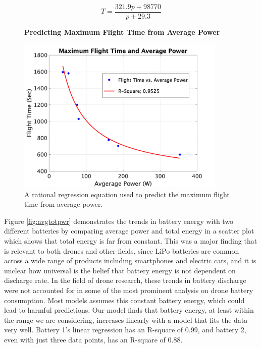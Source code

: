 \documentclass{article}
\begin{document}
\begin{equation}
T={\frac {321.9p + 98770}{p + 29.3}}
\end{equation}

\begin{figure}[!h]
  \centering
  \large{\textbf{Predicting Maximum Flight Time from Average Power}}\par
  \includegraphics[width = 100mm]{images/FlightTime.png}
  \caption{A rational regression equation used to predict the maximum flight time from average power.}
  \label{fig:flighttime}
\end{figure}



Figure \ref{fig:avgtotpwr} demonstrates the trends in battery energy with two different batteries by comparing average power and total energy in a scatter plot which shows that total energy is far from constant. This was a major finding that is relevant to both drones and other fields, since LiPo batteries are common across a wide range of products including smartphones and electric cars, and it is unclear how universal is the belief that battery energy is not dependent on discharge rate. In the field of drone research, these trends in battery discharge were not accounted for in some of the most prominent analysis on drone battery consumption. Most models assumes this constant battery energy, which could lead to harmful predictions. Our model finds that battery energy, at least within the range we are considering, increases linearly with a model that fits the data very well. Battery 1's linear regression has an R-square of 0.99, and battery 2, even with just three data points, has an R-square of 0.88.
\end{document}
